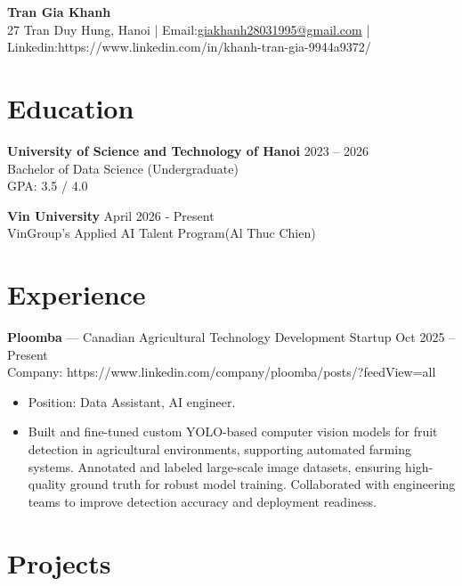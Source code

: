 \documentclass[11pt,a4paper]{article}
\begin{document}
\begin{center}
    {\LARGE \textbf{Tran Gia Khanh}} \\[4pt]
    27 Tran Duy Hung, Hanoi \;|\; Email:\href{mailto:giakhanh28031995@gmail.com}{giakhanh28031995@gmail.com} \;| \\[2pt]
    Linkedin:https://www.linkedin.com/in/khanh-tran-gia-9944a9372/
\end{center}

\section*{Education}
\textbf{University of Science and Technology of Hanoi} \hfill 2023 -- 2026 \\
Bachelor of Data Science (Undergraduate) \\
GPA: 3.5 / 4.0

\textbf{Vin University} \hfill April 2026 - Present \\
VinGroup's Applied AI Talent Program(Al Thuc Chien)


\section*{Experience}
\textbf{Ploomba} — Canadian Agricultural Technology Development  Startup \hfill Oct 2025 -- Present \\
Company: {https://www.linkedin.com/company/ploomba/posts/?feedView=all}
\begin{itemize}[leftmargin=1.5em]
    \item Position: Data Assistant, AI engineer.
    \item Built and fine-tuned custom YOLO-based computer vision models for fruit detection in agricultural environments, supporting automated farming systems. Annotated and labeled large-scale image datasets, ensuring high-quality ground truth for robust model training. Collaborated with engineering teams to improve detection accuracy and deployment readiness.
\end{itemize}

\section*{Projects}
\end{document}

